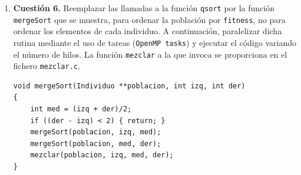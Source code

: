 \documentclass[12pt]{article}
\begin{document}
\begin{enumerate}
\begin{enumerate}
    \item \textbf{Mejoría a 1 y 2 hilos:}
    \begin{itemize}
        \item Con **1 hilo**, el tiempo baja de $0,190\text{ s}$ a $0,150\text{ s}$ debido únicamente a la reestructuración del código interno de la función.
        \item Con **2 hilos**, el tiempo se reduce prácticamente a la mitad (**$0,090\text{ s}$**, logrando un $S_2 = 2,11$). Esto se debe a que cada una de las 2 secciones independientes (\texttt{hijo1} e \texttt{hijo2}) es ejecutada por un hilo dedicado, aprovechando el paralelismo real de la función al máximo.
    \end{itemize}

    \item \textbf{Estancamiento y degradación a partir de 4 hilos:}
    \begin{itemize}
        \item Con **4 hilos**, el tiempo se mantiene en $0,090\text{ s}$ porque la función solo define **2 secciones**. Por tanto, únicamente 2 hilos realizan el trabajo de creación de hijos mientras los otros 2 hilos se quedan ociosos esperando en la barrera implícita de sincronización.
        \item Con **8 y 12 hilos**, el tiempo empeora notablemente ($0,120\text{ s}$ y $0,150\text{ s}$, respectivamente). La creación, gestión y reserva innecesaria de tantos hilos extra para ejecutar únicamente 2 secciones genera una sobrecarga (*overhead*) de recursos que destruye la eficiencia del algoritmo.
    \end{itemize}
\end{enumerate}


\newpage

\item \textbf{Cuestión 6.} Reemplazar las llamadas a la función \texttt{qsort} por la función \texttt{mergeSort} que se muestra, para ordenar la población por \texttt{fitness}, no para ordenar los elementos de cada individuo. A continuación, paralelizar dicha rutina mediante el uso de tareas (\texttt{OpenMP tasks}) y ejecutar el código variando el número de hilos. La función \texttt{mezclar} a la que invoca se proporciona en el fichero \texttt{mezclar.c}.

\begin{lstlisting}[style=EstiloC]
void mergeSort(Individuo **poblacion, int izq, int der)
{
    int med = (izq + der)/2;
    if ((der - izq) < 2) { return; }
    mergeSort(poblacion, izq, med);
    mergeSort(poblacion, med, der);
    mezclar(poblacion, izq, med, der);
}
\end{lstlisting}


\end{enumerate}
\end{document}
